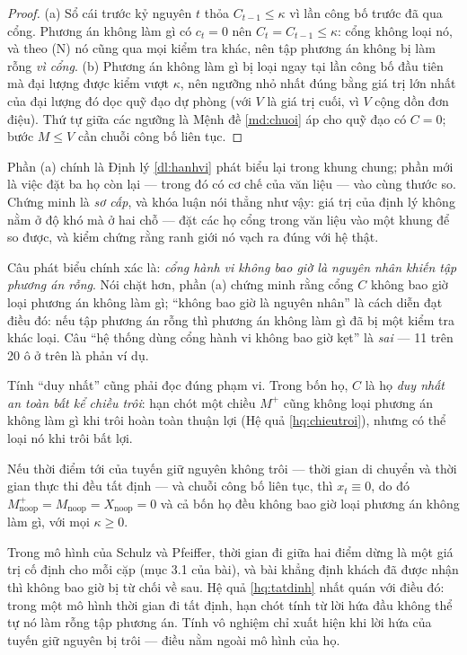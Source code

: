 \begin{proof}
(a) Sổ cái trước kỷ nguyên $t$ thỏa $C_{t-1} \le \kappa$ vì lần công bố trước đã qua cổng. Phương
án không làm gì có $c_t = 0$ nên $C_t = C_{t-1} \le \kappa$: cổng không loại nó, và theo (N) nó
cũng qua mọi kiểm tra khác, nên tập phương án không bị làm rỗng \emph{vì cổng}. (b) Phương án không
làm gì bị loại ngay tại lần công bố đầu tiên mà đại lượng được kiểm vượt $\kappa$, nên ngưỡng nhỏ
nhất đúng bằng giá trị lớn nhất của đại lượng đó dọc quỹ đạo dự phòng (với $V$ là giá trị cuối, vì
$V$ cộng dồn đơn điệu). Thứ tự giữa các ngưỡng là Mệnh đề \ref{md:chuoi} áp cho quỹ đạo có
$C = 0$; bước $M \le V$ cần chuỗi công bố liên tục.
\end{proof}

Phần (a) chính là Định lý \ref{dl:hanhvi} phát biểu lại trong khung chung; phần mới là việc đặt ba họ còn lại
--- trong đó có cơ chế của văn liệu --- vào cùng thước so. Chứng minh là \emph{sơ cấp}, và khóa
luận nói thẳng như vậy: giá trị của định lý không nằm ở độ khó mà ở hai chỗ --- đặt các họ cổng
trong văn liệu vào một khung để so được, và kiểm chứng rằng ranh giới nó vạch ra đúng với hệ thật.

Câu phát biểu chính xác là: \emph{cổng hành vi không bao giờ là nguyên nhân khiến tập phương án
rỗng}. Nói chặt hơn, phần (a) chứng minh rằng cổng $C$ không bao giờ loại phương án không làm gì;
``không bao giờ là nguyên nhân'' là cách diễn đạt điều đó: nếu tập phương án rỗng thì phương án
không làm gì đã bị một kiểm tra khác loại. Câu ``hệ thống dùng cổng hành vi không bao giờ kẹt'' là
\emph{sai} --- 11 trên 20 ô ở trên là phản ví dụ.

Tính ``duy nhất'' cũng phải đọc đúng phạm vi. Trong bốn họ, $C$ là họ \emph{duy nhất an toàn bất kể
chiều trôi}: hạn chót một chiều $M^{+}$ cũng không loại phương án không làm gì khi trôi hoàn toàn
thuận lợi (Hệ quả \ref{hq:chieutroi}), nhưng có thể loại nó khi trôi bất lợi.

\begin{hequa}
\label{hq:tatdinh}
Nếu thời điểm tới của tuyến giữ nguyên không trôi --- thời gian di chuyển và thời gian thực thi
đều tất định --- và chuỗi công bố liên tục, thì $x_t \equiv 0$, do đó
$M^{+}_{\text{noop}} = M_{\text{noop}} = X_{\text{noop}} = 0$ và cả bốn họ đều không bao giờ loại
phương án không làm gì, với mọi $\kappa \ge 0$.
\end{hequa}

Trong mô hình của Schulz và Pfeiffer, thời gian đi giữa hai điểm dừng là một giá trị cố định cho
mỗi cặp (mục 3.1 của bài), và bài khẳng định khách đã được nhận thì không bao giờ bị từ chối về
sau. Hệ quả \ref{hq:tatdinh} nhất quán với điều đó: trong một mô hình thời gian đi tất định, hạn
chót tính từ lời hứa đầu không thể tự nó làm rỗng tập phương án. Tính vô nghiệm chỉ xuất hiện khi
lời hứa của tuyến giữ nguyên bị trôi --- điều nằm ngoài mô hình của họ.

